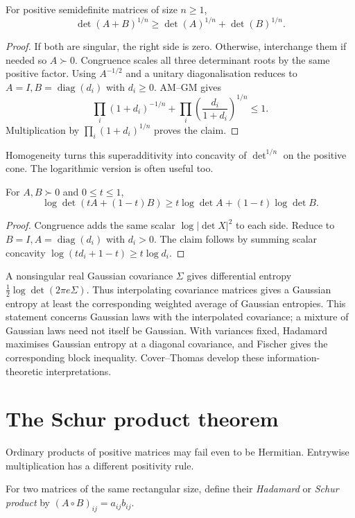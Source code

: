 \begin{theorem}\label{linear:thm:minkowskidet}
For positive semidefinite matrices of size $n\ge1$,
\[\det(A+B)^{1/n}\ge\det(A)^{1/n}+\det(B)^{1/n}.\]
\end{theorem}
\begin{proof}
If both are singular, the right side is zero. Otherwise, interchange them if needed so $A\succ0$. Congruence scales all three determinant roots by the same positive factor. Using $A^{-1/2}$ and a unitary diagonalisation reduces to $A=I,B=\operatorname{diag}(d_i)$ with $d_i\ge0$. AM--GM gives
\[\prod_i(1+d_i)^{-1/n}+\prod_i\left(\frac{d_i}{1+d_i}\right)^{1/n}\le1.
\]
Multiplication by $\prod_i(1+d_i)^{1/n}$ proves the claim.
\end{proof}

Homogeneity turns this superadditivity into concavity of $\det^{1/n}$ on the positive cone. The logarithmic version is often useful too.
\begin{theorem}\label{linear:thm:logdet}
For $A,B\succ0$ and $0\le t\le1$,
\[\log\det(tA+(1-t)B)\ge t\log\det A+(1-t)\log\det B.\]
\end{theorem}
\begin{proof}
Congruence adds the same scalar $\log|\det X|^2$ to each side. Reduce to $B=I,A=\operatorname{diag}(d_i)$ with $d_i>0$. The claim follows by summing scalar concavity $\log(td_i+1-t)\ge t\log d_i$.
\end{proof}

\begin{remark}
A nonsingular real Gaussian covariance $\Sigma$ gives differential entropy $\tfrac12\log\det(2\pi e\Sigma)$. Thus interpolating covariance matrices gives a Gaussian entropy at least the corresponding weighted average of Gaussian entropies. This statement concerns Gaussian laws with the interpolated covariance; a mixture of Gaussian laws need not itself be Gaussian. With variances fixed, Hadamard maximises Gaussian entropy at a diagonal covariance, and Fischer gives the corresponding block inequality. Cover--Thomas develop these information-theoretic interpretations.
\end{remark}
\section{The Schur product theorem}

Ordinary products of positive matrices may fail even to be Hermitian. Entrywise multiplication has a different positivity rule.
\begin{definition}\label{linear:def:hadamardproduct}
For two matrices of the same rectangular size, define their \emph{Hadamard} or \emph{Schur product} by $(A\circ B)_{ij}=a_{ij}b_{ij}$.
\end{definition}

